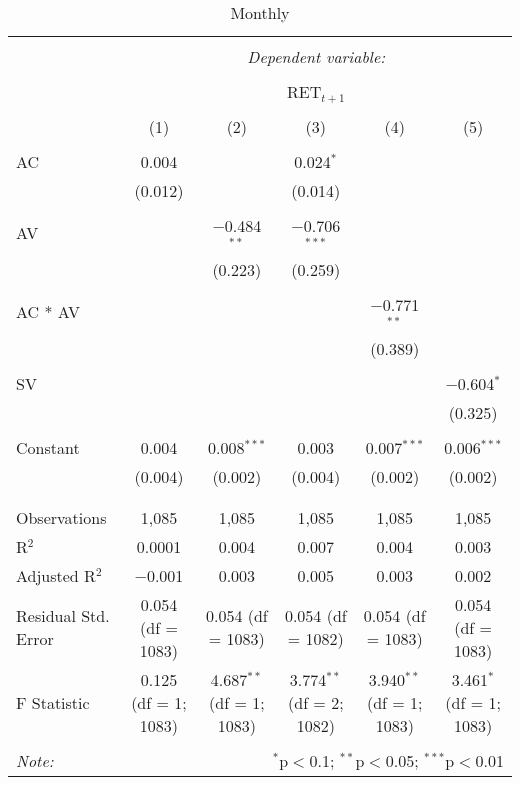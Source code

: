 
\begin{table}[!htbp] \centering 
  \caption{Monthly} 
  \label{} 
\begin{adjustbox}{width=1\textwidth}
	\begin{tabular}{@{\extracolsep{5pt}}lccccc} 
\\[-1.8ex]\hline 
\hline \\[-1.8ex] 
 & \multicolumn{5}{c}{\textit{Dependent variable:}} \\ 
\cline{2-6} 
\\[-1.8ex] & \multicolumn{5}{c}{RET$_{t+1}$} \\ 
\\[-1.8ex] & (1) & (2) & (3) & (4) & (5)\\ 
\hline \\[-1.8ex] 
 AC & 0.004 &  & 0.024$^{*}$ &  &  \\ 
  & (0.012) &  & (0.014) &  &  \\ 
  & & & & & \\ 
 AV &  & $-$0.484$^{**}$ & $-$0.706$^{***}$ &  &  \\ 
  &  & (0.223) & (0.259) &  &  \\ 
  & & & & & \\ 
 AC * AV &  &  &  & $-$0.771$^{**}$ &  \\ 
  &  &  &  & (0.389) &  \\ 
  & & & & & \\ 
 SV &  &  &  &  & $-$0.604$^{*}$ \\ 
  &  &  &  &  & (0.325) \\ 
  & & & & & \\ 
 Constant & 0.004 & 0.008$^{***}$ & 0.003 & 0.007$^{***}$ & 0.006$^{***}$ \\ 
  & (0.004) & (0.002) & (0.004) & (0.002) & (0.002) \\ 
  & & & & & \\ 
\hline \\[-1.8ex] 
Observations & 1,085 & 1,085 & 1,085 & 1,085 & 1,085 \\ 
R$^{2}$ & 0.0001 & 0.004 & 0.007 & 0.004 & 0.003 \\ 
Adjusted R$^{2}$ & $-$0.001 & 0.003 & 0.005 & 0.003 & 0.002 \\ 
Residual Std. Error & 0.054 (df = 1083) & 0.054 (df = 1083) & 0.054 (df = 1082) & 0.054 (df = 1083) & 0.054 (df = 1083) \\ 
F Statistic & 0.125 (df = 1; 1083) & 4.687$^{**}$ (df = 1; 1083) & 3.774$^{**}$ (df = 2; 1082) & 3.940$^{**}$ (df = 1; 1083) & 3.461$^{*}$ (df = 1; 1083) \\ 
\hline 
\hline \\[-1.8ex] 
\textit{Note:}  & \multicolumn{5}{r}{$^{*}$p$<$0.1; $^{**}$p$<$0.05; $^{***}$p$<$0.01} \\ 
\end{tabular} 
\end{adjustbox}
\end{table} 
